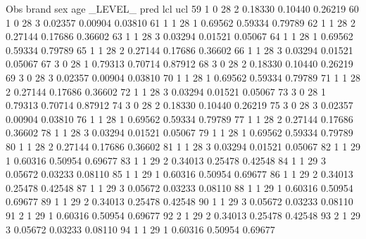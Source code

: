 \documentclass{article}
\begin{document}
\begin{Woutput}
 Obs    brand    sex    age    _LEVEL_      pred       lcl        ucl
  59      1       0      28       2       0.18330    0.10440    0.26219
  60      1       0      28       3       0.02357    0.00904    0.03810
  61      1       1      28       1       0.69562    0.59334    0.79789
  62      1       1      28       2       0.27144    0.17686    0.36602
  63      1       1      28       3       0.03294    0.01521    0.05067
  64      1       1      28       1       0.69562    0.59334    0.79789
  65      1       1      28       2       0.27144    0.17686    0.36602
  66      1       1      28       3       0.03294    0.01521    0.05067
  67      3       0      28       1       0.79313    0.70714    0.87912
  68      3       0      28       2       0.18330    0.10440    0.26219
  69      3       0      28       3       0.02357    0.00904    0.03810
  70      1       1      28       1       0.69562    0.59334    0.79789
  71      1       1      28       2       0.27144    0.17686    0.36602
  72      1       1      28       3       0.03294    0.01521    0.05067
  73      3       0      28       1       0.79313    0.70714    0.87912
  74      3       0      28       2       0.18330    0.10440    0.26219
  75      3       0      28       3       0.02357    0.00904    0.03810
  76      1       1      28       1       0.69562    0.59334    0.79789
  77      1       1      28       2       0.27144    0.17686    0.36602
  78      1       1      28       3       0.03294    0.01521    0.05067
  79      1       1      28       1       0.69562    0.59334    0.79789
  80      1       1      28       2       0.27144    0.17686    0.36602
  81      1       1      28       3       0.03294    0.01521    0.05067
  82      1       1      29       1       0.60316    0.50954    0.69677
  83      1       1      29       2       0.34013    0.25478    0.42548
  84      1       1      29       3       0.05672    0.03233    0.08110
  85      1       1      29       1       0.60316    0.50954    0.69677
  86      1       1      29       2       0.34013    0.25478    0.42548
  87      1       1      29       3       0.05672    0.03233    0.08110
  88      1       1      29       1       0.60316    0.50954    0.69677
  89      1       1      29       2       0.34013    0.25478    0.42548
  90      1       1      29       3       0.05672    0.03233    0.08110
  91      2       1      29       1       0.60316    0.50954    0.69677
  92      2       1      29       2       0.34013    0.25478    0.42548
  93      2       1      29       3       0.05672    0.03233    0.08110
  94      1       1      29       1       0.60316    0.50954    0.69677

\end{Woutput}
\end{document}
